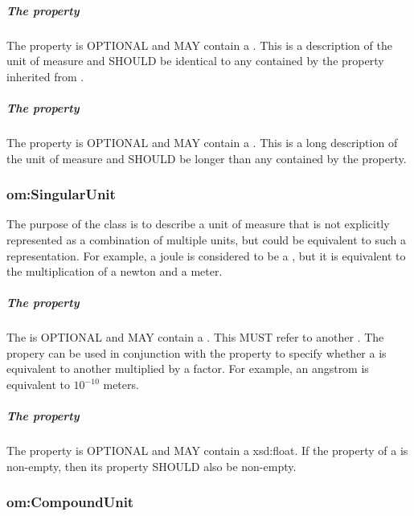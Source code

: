 \subparagraph{The  property}\label{sec:om:comment:Unit}
The  property is OPTIONAL and MAY contain a . This  is a description of the unit of measure and SHOULD be identical to any  contained by the  property inherited from .

\subparagraph{The  property}\label{sec:om:longcomment:Unit}
The  property is OPTIONAL and MAY contain a . This  is a long description of the unit of measure and SHOULD be longer than any  contained by the  property.

\subsubsection{om:SingularUnit}
\label{sec:om:SingularUnit}

The purpose of the  class is to describe a unit of measure that is not explicitly represented as a combination of multiple units, but could be equivalent to such a representation. For example, a joule is considered to be a , but it is equivalent to the multiplication of a newton and a meter.  

\subparagraph{The  property}\label{sec:om:hasUnit:SingularUnit}
The  is OPTIONAL and MAY contain a . This  MUST refer to another . The  propery can be used in conjunction with the  property to specify whether a  is equivalent to another  multiplied by a factor. For example, an angstrom is equivalent to $10^{-10}$ meters.

\subparagraph{The  property}\label{sec:om:hasFactor:SingularUnit}
The  property is OPTIONAL and MAY contain a xsd:float. If the  property of a  is non-empty, then its  property SHOULD also be non-empty.

\subsubsection{om:CompoundUnit}
\label{sec:om:CompoundUnit}

